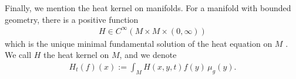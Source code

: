 \documentclass[12pt]{amsart}
\renewcommand{\1}{{\mathbf 1}}
\theoremstyle{others}
\numberwithin{equation}{section}
\newtheorem{definition}[thm]{Definition}
\begin{document}

 \par 
  Finally, we mention the heat kernel on manifolds. For a manifold with bounded geometry, there is a positive function
  \begin{align*}
      H \in C^\infty(M \times M \times (0, \infty))
  \end{align*} which is the unique minimal fundamental solution of the heat equation on \(M\) \cite[Theorem 4 in Chapter VIII.2]{chaveleigenvaluesbook}. We call \(H\) the heat kernel on \(M\), and we denote
    \begin{align*}
        H_t(f)(x) := \int_M H(x, y, t) f(y) \, \mu_g(y).
    \end{align*} 

\end{document}
